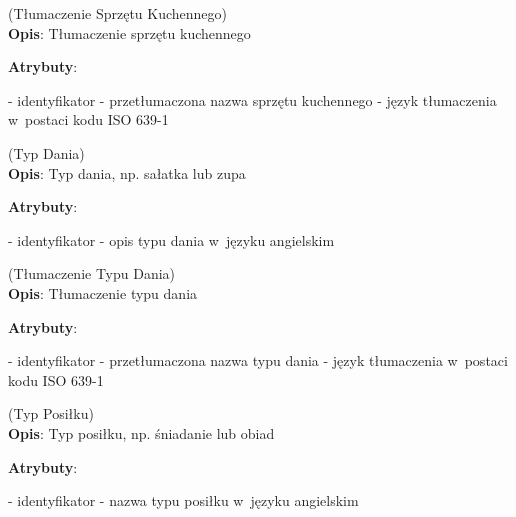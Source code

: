 \begin{enumerate}[label={\textbf{KAT/2/\protect\twodigits{\theenumi}}}, wide, labelwidth=!, labelindent=0pt, labelsep=0pt, series=reqs]
    \label{kat:KitchenApplianceTranslation} (Tłumaczenie Sprzętu Kuchennego)\\
    \indent\textbf{Opis}: Tłumaczenie sprzętu kuchennego
    \par
    \textbf{Atrybuty}:
    \begin{itemize}[series=atr, wide, align=left, leftmargin=190pt]
        \label{kat:KitchenApplianceTranslation:id}- identyfikator
        \label{kat:KitchenApplianceTranslation:translation}- przetłumaczona nazwa sprzętu kuchennego
        \label{kat:KitchenApplianceTranslation:language}- język tłumaczenia w~postaci kodu ISO 639-1
    \end{itemize}

    \label{kat:DishType} (Typ Dania)\\
    \indent\textbf{Opis}: Typ dania, np. sałatka lub zupa
    \par
    \textbf{Atrybuty}:
    \begin{itemize}[series=atr, wide, align=left, leftmargin=190pt]
        \label{kat:DishType:id}- identyfikator
        \label{kat:DishType:description}- opis typu dania w~języku angielskim
    \end{itemize}

    \label{kat:DishTypeTranslation} (Tłumaczenie Typu Dania)\\
    \indent\textbf{Opis}: Tłumaczenie typu dania
    \par
    \textbf{Atrybuty}:
    \begin{itemize}[series=atr, wide, align=left, leftmargin=190pt]
        \label{kat:DishTypeTranslation:id}- identyfikator
        \label{kat:DishTypeTranslation:translation}- przetłumaczona nazwa typu dania
        \label{kat:DishTypeTranslation:language}- język tłumaczenia w~postaci kodu ISO 639-1
    \end{itemize}

    \label{kat:MealType} (Typ Posiłku)\\
    \indent\textbf{Opis}: Typ posiłku, np. śniadanie lub obiad
    \par
    \textbf{Atrybuty}:
    \begin{itemize}[series=atr, wide, align=left, leftmargin=190pt]
        \label{kat:MealType:id}- identyfikator
        \label{kat:MealType:name}- nazwa typu posiłku w~języku angielskim
    \end{itemize}


\end{enumerate}
